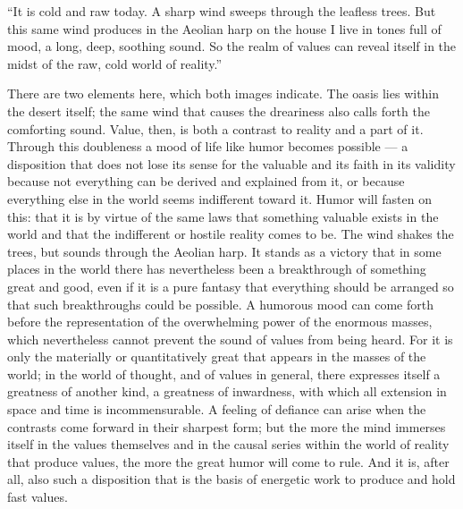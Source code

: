 \documentclass[12pt]{book}
\newcommand{\opage}[1]{\marginnote{\footnotesize\textit{[#1]}}}
\begin{document}
``It is cold and raw today. A sharp wind sweeps through the leafless trees. But this
same wind produces in the Aeolian harp on the house I live in tones full of mood, a
long, deep, soothing sound. So the realm of values can reveal itself in the midst of
the raw, cold world of reality.''

\opage{71}There are two elements here, which both images indicate. The oasis lies
within the desert itself; the same wind that causes the dreariness also calls forth
the comforting sound. Value, then, is both a contrast to reality and a part of it.
Through this doubleness a mood of life like humor becomes possible --- a disposition
that does not lose its sense for the valuable and its faith in its validity because
not everything can be derived and explained from it, or because everything else in
the world seems indifferent toward it. Humor will fasten on this: that it is by
virtue of the same laws that something valuable exists in the world and that the
indifferent or hostile reality comes to be. The wind shakes the trees, but sounds
through the Aeolian harp. It stands as a victory that in some places in the world
there has nevertheless been a breakthrough of something great and good, even if it is
a pure fantasy that everything should be arranged so that such breakthroughs could be
possible. A humorous mood can come forth before the representation of the
overwhelming power of the enormous masses, which nevertheless cannot prevent the
sound of values from being heard. For it is only the materially or quantitatively
great that appears in the masses of the world; in the world of thought, and of values
in general, there expresses itself a greatness of another kind, a greatness of
inwardness, with which all extension in space and time is incommensurable. A feeling
of defiance can arise when the contrasts come forward in their sharpest form; but the
more the mind immerses itself in the values themselves and in the causal series within
the world of reality that produce values, the more the great humor will come to rule.
And it is, after all, also such a disposition that
is the basis of energetic work to produce and hold fast values.
\end{document}
